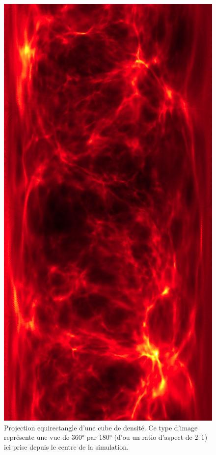 
\begin{figure}[bth]
        \includegraphics[height=.95\textheight]{img/04/equi.png} 
        \caption{Projection equirectangle d'une cube de densité.
        Ce type d'image représente une vue de $360°$ par $180°$ (d'ou un ratio d'aspect de $2:1$) ici prise depuis le centre de la simulation.}
 		\label{fig:equirectangle}
\end{figure}

